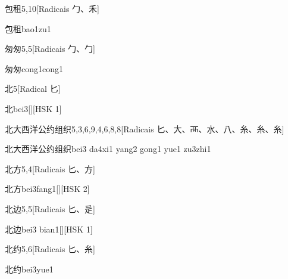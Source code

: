 \begin{entry}{包租}{5,10}[Radicais ⼓、⽲]
  \begin{phonetics}{包租}{bao1zu1}
  \end{phonetics}
\end{entry}

\begin{entry}{匆匆}{5,5}[Radicais ⼓、⼓]
  \begin{phonetics}{匆匆}{cong1cong1}
  \end{phonetics}
\end{entry}

\begin{entry}{北}{5}[Radical ⼔]
  \begin{phonetics}{北}{bei3}[][HSK 1]
  \end{phonetics}
\end{entry}

\begin{entry}{北大西洋公约组织}{5,3,6,9,4,6,8,8}[Radicais ⼔、⼤、⾑、⽔、⼋、⽷、⽷、⽷]
  \begin{phonetics}{北大西洋公约组织}{bei3 da4xi1 yang2 gong1 yue1 zu3zhi1}
  \end{phonetics}
\end{entry}

\begin{entry}{北方}{5,4}[Radicais ⼔、⽅]
  \begin{phonetics}{北方}{bei3fang1}[][HSK 2]
  \end{phonetics}
\end{entry}

\begin{entry}{北边}{5,5}[Radicais ⼔、⾡]
  \begin{phonetics}{北边}{bei3 bian1}[][HSK 1]
  \end{phonetics}
\end{entry}

\begin{entry}{北约}{5,6}[Radicais ⼔、⽷]
  \begin{phonetics}{北约}{bei3yue1}
  \end{phonetics}
\end{entry}

